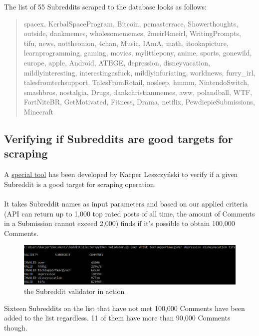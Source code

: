 \documentclass[openany]{article}
\begin{document}
The list of 55 Subreddits scraped to the database looks as follows:
\begin{quote}
spacex,	KerbalSpaceProgram,	Bitcoin,	pcmasterrace,	Showerthoughts,	outside,	dankmemes,	wholesomememes,	2meirl4meirl,	WritingPrompts,	tifu,	news,	nottheonion,	4chan,	Music,	IAmA,	math,	itookapicture,	learnprogramming,	gaming,	movies,	mylittlepony,	anime,	sports,	gonewild,	europe,	apple,	Android,	ATBGE,	depression,	disneyvacation,	mildlyinteresting,	interestingasfuck,	mildlyinfuriating,	worldnews,	furry\_irl,	talesfromtechsupport,	TalesFromRetail,	nosleep,	hmmm,	NintendoSwitch,	smashbros,	nostalgia,	Drugs,	dankchristianmemes,	aww,	polandball,	WTF,	FortNiteBR,	GetMotivated,	Fitness,	Drama,	netflix,	PewdiepieSubmissions,	Minecraft
\end{quote}


\subsection{Verifying if Subreddits are good targets for scraping}

A \href{https://github.com/scrapingredditboys/ScrapingRedditNaturalLanguageProcessingWUT2019/blob/master/reddit-collector/validator.py}{special tool} has been developed by Kacper Leszczyński to verify if a given Subreddit is a good target for scraping operation. \\ \\
It takes Subreddit names as input parameters and based on our applied criteria (API can return up to 1,000 top rated posts of all time, the amount of Comments in a Submission cannot exceed 2,000) finds if it's possible to obtain 100,000 Comments.

\begin{figure}[htb!]
    \centering
    \includegraphics[width=\textwidth]{validator.png}
    \caption{the Subreddit validator in action}
    \label{fig:mesh1}
\end{figure}

Sixteen Subreddits on the list that have not met 100,000 Comments have been added to the list regardless. 11 of them have more than 90,000 Comments though.
\end{document}
